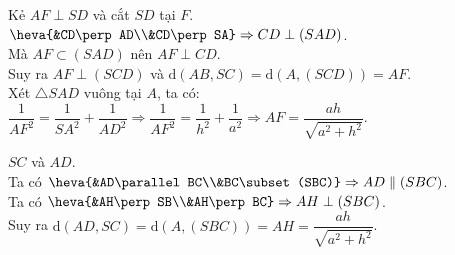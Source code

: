 \begin{vd}
{\begin{listEX}[1]
			Kẻ $AF\perp SD$ và cắt $SD$ tại $F$.\\
			$\heva{&CD\perp AD\\&CD\perp SA}\Rightarrow CD\perp (SAD)$.\\
			Mà $AF\subset(SAD)$ nên $AF\perp CD$.\\
			Suy ra $AF\perp(SCD)$ và $\mathrm{d}(AB,SC)=\mathrm{d}(A,(SCD))=AF$.\\
			Xét $\triangle SAD$ vuông tại $A$, ta có:
			$\dfrac{1}{AF^2}= \dfrac{1}{SA^2} + \dfrac{1}{AD^2} \Rightarrow \dfrac{1}{AF^2}= \dfrac{1}{h^2}+\dfrac{1}{a^2}\Rightarrow AF = \dfrac{ah}{\sqrt{a^2 + h^2}}$.
			\item $SC$ và $AD$.\\
			Ta có $\heva{&AD\parallel BC\\&BC\subset(SBC)}\Rightarrow AD\parallel(SBC)$.\\
			Ta có $\heva{&AH\perp SB\\&AH\perp BC}\Rightarrow AH\perp(SBC)$.\\
			Suy ra $\mathrm{d}(AD,SC)=\mathrm{d}(A,(SBC))=AH=\dfrac{ah}{\sqrt{a^2+h^2}}$.
		\end{listEX}	
	}
\end{vd}

